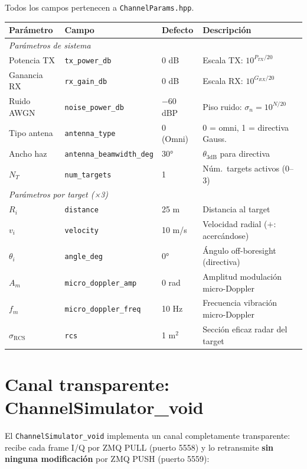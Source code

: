 \documentclass[11pt,a4paper]{article}
\begin{document}
{\small
\noindent Todos los campos pertenecen a \texttt{ChannelParams.hpp}.

\begin{tabularx}{\linewidth}{l p{4.6cm} p{2.0cm} X}
\toprule
\textbf{Parámetro} & \textbf{Campo} & \textbf{Defecto} & \textbf{Descripción} \\
\midrule
\multicolumn{4}{l}{\textit{Parámetros de sistema}} \\
Potencia TX & \texttt{tx\_power\_db} & 0 dB & Escala TX: $10^{P_{TX}/20}$ \\
Ganancia RX & \texttt{rx\_gain\_db} & 0 dB & Escala RX: $10^{G_{RX}/20}$ \\
Ruido AWGN  & \texttt{noise\_power\_db} & $-60$ dBP & Piso ruido: $\sigma_n = 10^{N/20}$ \\
Tipo antena & \texttt{antenna\_type} & 0 (Omni) & 0 = omni, 1 = directiva Gauss. \\
Ancho haz   & \texttt{antenna\_beamwidth\_deg} & 30° & $\theta_{3\text{dB}}$ para directiva \\
$N_T$       & \texttt{num\_targets} & 1 & Núm.\ targets activos (0–3) \\
\midrule
\multicolumn{4}{l}{\textit{Parámetros por target (×3)}} \\
$R_i$            & \texttt{distance}          & 25 m   & Distancia al target \\
$v_i$            & \texttt{velocity}          & 10 m/s & Velocidad radial ($+$: acercándose) \\
$\theta_i$       & \texttt{angle\_deg}        & 0°     & Ángulo off-boresight (directiva) \\
$A_m$            & \texttt{micro\_doppler\_amp}  & 0 rad  & Amplitud modulación micro-Doppler \\
$f_m$            & \texttt{micro\_doppler\_freq} & 10 Hz  & Frecuencia vibración micro-Doppler \\
$\sigma_\text{RCS}$ & \texttt{rcs}            & 1 m$^2$ & Sección eficaz radar del target \\
\bottomrule
\end{tabularx}
}

\section{Canal transparente: ChannelSimulator\_void}

El \texttt{ChannelSimulator\_void} implementa un canal completamente transparente:
recibe cada frame I/Q por ZMQ PULL (puerto 5558) y lo retransmite \textbf{sin ninguna
modificación} por ZMQ PUSH (puerto 5559):
\end{document}
